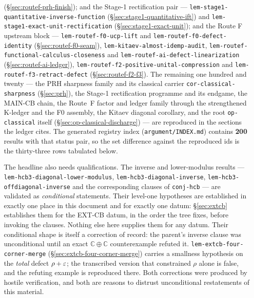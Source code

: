 (\S\ref{sec:routef-prh-finish});
and the Stage-1 rectification pair ---
\texttt{lem-stage1-quantitative-inverse-function} (\S\ref{sec:stage1-quantitative-ift})
and \texttt{lem-stage1-exact-unit-rectification} (\S\ref{sec:stage1-exact-unit});
and the Route F upstream block ---
\texttt{lem-routef-f0-ucp-lift} and
\texttt{lem-routef-f0-defect-identity} (\S\ref{sec:routef-f0-seam}),
\texttt{lem-kitaev-almost-idemp-audit},
\texttt{lem-routef-functional-calculus-closeness} and
\texttt{lem-routef-ai-defect-linearization} (\S\ref{sec:routef-ai-ledger}),
\texttt{lem-routef-f2-positive-unital-compression} and
\texttt{lem-routef-f3-retract-defect} (\S\ref{sec:routef-f2-f3}).
The remaining one hundred and twenty --- the PRH sharpness family and its classical
carrier \texttt{cor-classical-sharpness} (\S\ref{sec:prh}), the Stage-1 rectification
programme and its endgame, the MAIN-CB chain, the Route~F factor and ledger family
through the strengthened K-ledger and the F0 assembly, the Kitaev diagonal corollary,
and the root \texttt{op-classical} itself (\S\ref{sec:op-classical-discharge}) --- are
reproduced in the sections the ledger cites.
The generated registry index (\texttt{argument/INDEX.md}) contains \textbf{200}
results with that status pair, so the set difference against the reproduced ids is the
thirty-three rows tabulated below.

The headline also needs qualifications. The inverse and lower-modulus results
--- \texttt{lem-hcb3-diagonal-lower-modulus}, \texttt{lem-hcb3-diagonal-inverse},
\texttt{lem-hcb3-offdiagonal-inverse} and the corresponding clauses of
\texttt{conj-hcb} --- are validated as \emph{conditional} statements. Their level-one
hypotheses are established in exactly one place in this document and for exactly one
datum: \S\ref{sec:extcb} establishes them for the EXT-CB datum, in the order the tree
fixes, before invoking the clauses. Nothing else here supplies them for any datum. Their
conditional shape is itself a correction of record: the parent's inverse clause was
unconditional until an exact $\mathbb C\oplus\mathbb C$ counterexample refuted it.
\texttt{lem-extcb-four-corner-merge} (\S\ref{sec:extcb-four-corner-merge}) carries
a smallness hypothesis on the \emph{total} defect $\rho+\varepsilon$; the transcribed version
that constrained $\rho$ alone is false, and the refuting example is
reproduced there. Both corrections were produced by hostile verification, and both are
reasons to distrust unconditional restatements of this material.

